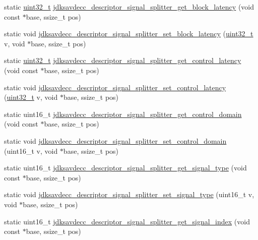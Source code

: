 \begin{DoxyCompactItemize}
\item 
static \hyperlink{parse_8c_a6eb1e68cc391dd753bc8ce896dbb8315}{uint32\+\_\+t} \hyperlink{group__descriptor__signal__splitter_ga3483655129d2898c4a16892d6fcae3d8}{jdksavdecc\+\_\+descriptor\+\_\+signal\+\_\+splitter\+\_\+get\+\_\+block\+\_\+latency} (void const $\ast$base, ssize\+\_\+t pos)
\item 
static void \hyperlink{group__descriptor__signal__splitter_ga41ebbed787c1b7b04579988a2650c408}{jdksavdecc\+\_\+descriptor\+\_\+signal\+\_\+splitter\+\_\+set\+\_\+block\+\_\+latency} (\hyperlink{parse_8c_a6eb1e68cc391dd753bc8ce896dbb8315}{uint32\+\_\+t} v, void $\ast$base, ssize\+\_\+t pos)
\item 
static \hyperlink{parse_8c_a6eb1e68cc391dd753bc8ce896dbb8315}{uint32\+\_\+t} \hyperlink{group__descriptor__signal__splitter_gad263632abe4a6b67481a151dd84950b0}{jdksavdecc\+\_\+descriptor\+\_\+signal\+\_\+splitter\+\_\+get\+\_\+control\+\_\+latency} (void const $\ast$base, ssize\+\_\+t pos)
\item 
static void \hyperlink{group__descriptor__signal__splitter_gaa94265e3e443e7b13474ad68f0545eef}{jdksavdecc\+\_\+descriptor\+\_\+signal\+\_\+splitter\+\_\+set\+\_\+control\+\_\+latency} (\hyperlink{parse_8c_a6eb1e68cc391dd753bc8ce896dbb8315}{uint32\+\_\+t} v, void $\ast$base, ssize\+\_\+t pos)
\item 
static uint16\+\_\+t \hyperlink{group__descriptor__signal__splitter_ga5c6c58ab3ffa279d14705c6368734427}{jdksavdecc\+\_\+descriptor\+\_\+signal\+\_\+splitter\+\_\+get\+\_\+control\+\_\+domain} (void const $\ast$base, ssize\+\_\+t pos)
\item 
static void \hyperlink{group__descriptor__signal__splitter_gad25d0a8f9430d6f76e712d50443046cb}{jdksavdecc\+\_\+descriptor\+\_\+signal\+\_\+splitter\+\_\+set\+\_\+control\+\_\+domain} (uint16\+\_\+t v, void $\ast$base, ssize\+\_\+t pos)
\item 
static uint16\+\_\+t \hyperlink{group__descriptor__signal__splitter_gadcbd975d006ce2a1c3630fe0df6273a4}{jdksavdecc\+\_\+descriptor\+\_\+signal\+\_\+splitter\+\_\+get\+\_\+signal\+\_\+type} (void const $\ast$base, ssize\+\_\+t pos)
\item 
static void \hyperlink{group__descriptor__signal__splitter_ga6a5eddca6d1e8d8a2871c434239da9d7}{jdksavdecc\+\_\+descriptor\+\_\+signal\+\_\+splitter\+\_\+set\+\_\+signal\+\_\+type} (uint16\+\_\+t v, void $\ast$base, ssize\+\_\+t pos)
\item 
static uint16\+\_\+t \hyperlink{group__descriptor__signal__splitter_gac0b8125fd6afd7643f8ae700e7df5424}{jdksavdecc\+\_\+descriptor\+\_\+signal\+\_\+splitter\+\_\+get\+\_\+signal\+\_\+index} (void const $\ast$base, ssize\+\_\+t pos)

\end{DoxyCompactItemize}
